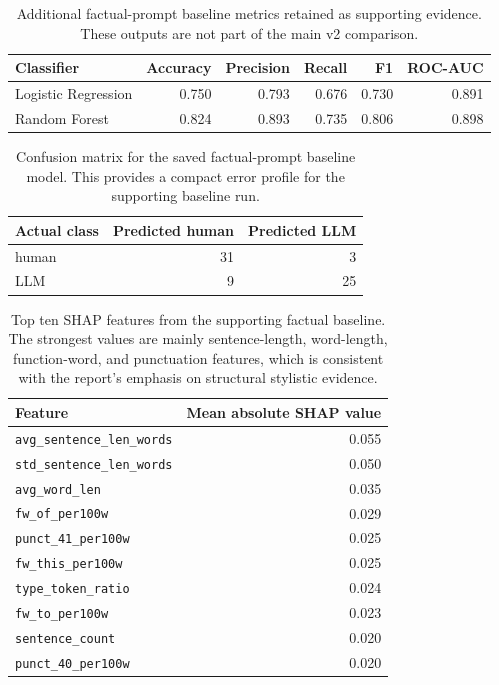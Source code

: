\documentclass[12pt,a4paper]{article}
\begin{document}
\begin{table}[H]
\centering
\small
\begin{tabular}{lrrrrr}
\toprule
Classifier & Accuracy & Precision & Recall & F1 & ROC-AUC \\
\midrule
Logistic Regression & 0.750 & 0.793 & 0.676 & 0.730 & 0.891 \\
Random Forest & 0.824 & 0.893 & 0.735 & 0.806 & 0.898 \\
\bottomrule
\end{tabular}
\caption{Additional factual-prompt baseline metrics retained as supporting evidence. These outputs are not part of the main v2 comparison.}
\label{tab:appendix-factual-metrics}
\end{table}

\begin{table}[H]
\centering
\small
\begin{tabular}{lrr}
\toprule
Actual class & Predicted human & Predicted LLM \\
\midrule
human & 31 & 3 \\
LLM & 9 & 25 \\
\bottomrule
\end{tabular}
\caption{Confusion matrix for the saved factual-prompt baseline model. This provides a compact error profile for the supporting baseline run.}
\label{tab:appendix-factual-confusion}
\end{table}

\begin{table}[H]
\centering
\small
\begin{tabular}{lr}
\toprule
Feature & Mean absolute SHAP value \\
\midrule
\texttt{avg\_sentence\_len\_words} & 0.055 \\
\texttt{std\_sentence\_len\_words} & 0.050 \\
\texttt{avg\_word\_len} & 0.035 \\
\texttt{fw\_of\_per100w} & 0.029 \\
\texttt{punct\_41\_per100w} & 0.025 \\
\texttt{fw\_this\_per100w} & 0.025 \\
\texttt{type\_token\_ratio} & 0.024 \\
\texttt{fw\_to\_per100w} & 0.023 \\
\texttt{sentence\_count} & 0.020 \\
\texttt{punct\_40\_per100w} & 0.020 \\
\bottomrule
\end{tabular}
\caption{Top ten SHAP features from the supporting factual baseline. The strongest values are mainly sentence-length, word-length, function-word, and punctuation features, which is consistent with the report's emphasis on structural stylistic evidence.}
\label{tab:appendix-shap-top}
\end{table}
\end{document}
